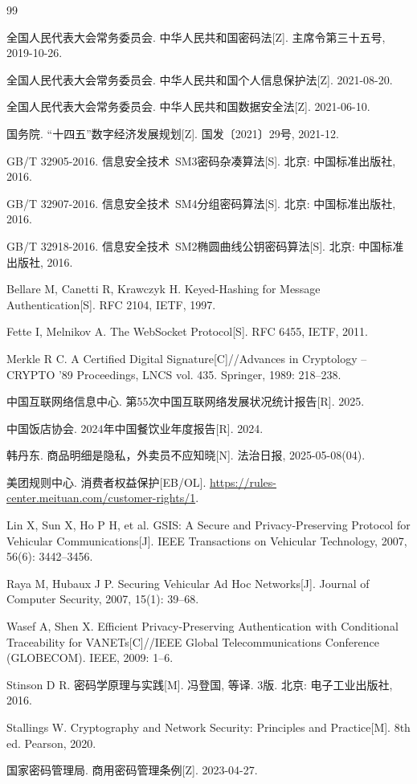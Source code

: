 \begin{thebibliography}{99}

全国人民代表大会常务委员会. 中华人民共和国密码法[Z]. 主席令第三十五号, 2019-10-26.

全国人民代表大会常务委员会. 中华人民共和国个人信息保护法[Z]. 2021-08-20.

全国人民代表大会常务委员会. 中华人民共和国数据安全法[Z]. 2021-06-10.

国务院. ``十四五''数字经济发展规划[Z]. 国发〔2021〕29号, 2021-12.

GB/T 32905-2016. 信息安全技术\ SM3密码杂凑算法[S]. 北京: 中国标准出版社, 2016.

GB/T 32907-2016. 信息安全技术\ SM4分组密码算法[S]. 北京: 中国标准出版社, 2016.

GB/T 32918-2016. 信息安全技术\ SM2椭圆曲线公钥密码算法[S]. 北京: 中国标准出版社, 2016.

Bellare M, Canetti R, Krawczyk H. Keyed-Hashing for Message Authentication[S]. RFC 2104, IETF, 1997.

Fette I, Melnikov A. The WebSocket Protocol[S]. RFC 6455, IETF, 2011.

Merkle R C. A Certified Digital Signature[C]//Advances in Cryptology -- CRYPTO '89 Proceedings, LNCS vol. 435. Springer, 1989: 218--238.

中国互联网络信息中心. 第55次中国互联网络发展状况统计报告[R]. 2025.

中国饭店协会. 2024年中国餐饮业年度报告[R]. 2024.

韩丹东. 商品明细是隐私，外卖员不应知晓[N]. 法治日报, 2025-05-08(04).

美团规则中心. 消费者权益保护[EB/OL]. \url{https://rules-center.meituan.com/customer-rights/1}.

Lin X, Sun X, Ho P H, et al. GSIS: A Secure and Privacy-Preserving Protocol for Vehicular Communications[J]. IEEE Transactions on Vehicular Technology, 2007, 56(6): 3442--3456.

Raya M, Hubaux J P. Securing Vehicular Ad Hoc Networks[J]. Journal of Computer Security, 2007, 15(1): 39--68.

Wasef A, Shen X. Efficient Privacy-Preserving Authentication with Conditional Traceability for VANETs[C]//IEEE Global Telecommunications Conference (GLOBECOM). IEEE, 2009: 1--6.

Stinson D R. 密码学原理与实践[M]. 冯登国, 等译. 3版. 北京: 电子工业出版社, 2016.

Stallings W. Cryptography and Network Security: Principles and Practice[M]. 8th ed. Pearson, 2020.

国家密码管理局. 商用密码管理条例[Z]. 2023-04-27.

\end{thebibliography}
